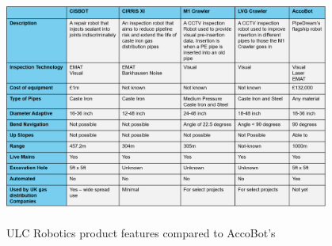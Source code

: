 \documentclass[11pt]{article}		%
\newcommand{\supercite}[1]{\textsuperscript{\cite{#1}}}		%
\newcommand{\sectref}[1]{\hyperref[#1]{Section \ref*{#1}}}     %
\begin{document}
	        
	        
	        
	        
	        
	        
	        
            
            \begin{table}[h]
				\centering
				\includegraphics[width=0.8\textwidth]{ULC_robot_comparison_formatted}
				\caption{ULC Robotics product features compared to AccoBot's\supercite{ULC_Robots}}
				\label{ULCFeatures}
			\end{table}
        
\end{document}
